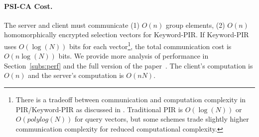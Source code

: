\documentclass[11pt]{article} %
\newcommand{\sectionref}[1]{Section~\ref{#1}}
\newcommand{\remove}[1]{}
\begin{document}
\paragraph{PSI-CA Cost.}  The server and client must communicate (1) $O(n)$ group elements, (2) $O(n)$ homomorphically encrypted selection vectors for Keyword-PIR. If Keyword-PIR uses $O(\log(N))$ bits for each vector\footnote{There is a tradeoff between communication and computation complexity in PIR/Keyword-PIR as discussed in \cite{EPRINT:ALPRSSY19}. Traditional PIR is $O(\log(N))$ or $O(polylog(N))$  for query vectors, but some schemes trade slightly higher communication complexity for reduced computational complexity.}, the total communication cost is $O(n\log(N))$ bits.  We provide more analysis of performance in \sectionref{subs:perf} and the full version of the paper~\cite{epione}. The client's computation is $O(n)$ and the server's computation is $O(nN)$.

\remove{

\subsubsection{PSI-CA Cost} 


In our PSI-CA protocol, communication cost is $O(n\log(N))$ while the client's computation is $O(n)$ and the server's computation is $O(nN)$. More specifically,

\begin{itemize}
	\item The server and client must communicate (1) $O(n)$ group elements, (2) $O(n)$ homomorphically encrypted selection vectors for Keyword-PIR. If Keyword-PIR uses $O(\log(N))$ bits for each vector\footnote{there is a tradeoff between communication and computation complexity in PIR/Keyword-PIR as discussed in \cite{EPRINT:ALPRSSY19}. Traditional PIR is $O(\log(N))$ for query vectors, but some schemes trade slightly higher communication complexity for reduced computational complexity.}, the total communication cost is $O(n\log(N))$ bits.  We provide more analysis of performance in \sectionref{subs:perf}.
	
	\item The client's computation cost consists of: (1) $O(n)$ group elements, (2) $O(n)$ homomorphic encryptions and decryptions for encoding the Keyword-PIR queries and decoding the results.
	
	\item The server's computation cost consists of: (1) $O(n)$ group elements, (2) $O(nN)$ additive homomorphic encryption operations for finding the answer to the Keyword-PIR query.
	
\end{itemize}
}
\end{document}
